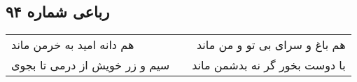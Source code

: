 \begin{center}
\section*{رباعی شماره ۹۴}
\label{sec:sh094}
\begin{longtable}{l p{0.5cm} r}
هم دانه امید به خرمن ماند
&&
هم باغ و سرای بی تو و من ماند
\\
سیم و زر خویش از درمی تا بجوی
&&
با دوست بخور گر نه بدشمن ماند
\\
\end{longtable}
\end{center}
